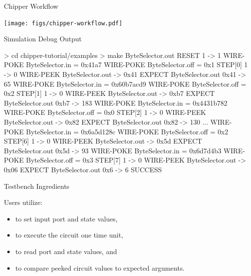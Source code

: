 \documentclass[xcolor=pdflatex,dvipsnames,table]{beamer}
\begin{document}
\begin{frame}[fragile]{Chipper Workflow}
\begin{center}
\texttt{[image: figs/chipper-workflow.pdf]} 
\end{center}
\end{frame}

\begin{frame}[fragile]{Simulation Debug Output}

{
\begin{stanza}
> cd chipper-tutorial/examples
> make ByteSelector.out
RESET 1 -> 1
WIRE-POKE ByteSelector.in = 0x41a7
WIRE-POKE ByteSelector.off = 0x1
STEP[0] 1 -> 0
WIRE-PEEK ByteSelector.out -> 0x41
EXPECT ByteSelector.out 0x41 -> 65
WIRE-POKE ByteSelector.in = 0x60b7acd9
WIRE-POKE ByteSelector.off = 0x2
STEP[1] 1 -> 0
WIRE-PEEK ByteSelector.out -> 0xb7
EXPECT ByteSelector.out 0xb7 -> 183
WIRE-POKE ByteSelector.in = 0x4431b782
WIRE-POKE ByteSelector.off = 0x0
STEP[2] 1 -> 0
WIRE-PEEK ByteSelector.out -> 0x82
EXPECT ByteSelector.out 0x82 -> 130
...
WIRE-POKE ByteSelector.in = 0x6a5d128c
WIRE-POKE ByteSelector.off = 0x2
STEP[6] 1 -> 0
WIRE-PEEK ByteSelector.out -> 0x5d
EXPECT ByteSelector.out 0x5d -> 93
WIRE-POKE ByteSelector.in = 0x6d7d4b3
WIRE-POKE ByteSelector.off = 0x3
STEP[7] 1 -> 0
WIRE-PEEK ByteSelector.out -> 0x06
EXPECT ByteSelector.out 0x6 -> 6
SUCCESS
\end{stanza}
}

\end{frame}

\begin{frame}{Testbench Ingredients}

Users utilize:
\begin{itemize}
\item {} to set input port and state values,
\item {} to execute the circuit one time unit,
\item {} to read port and state values, and
\item {} to compare peeked circuit values to expected arguments.
\end{itemize}

\end{frame}
\end{document}
